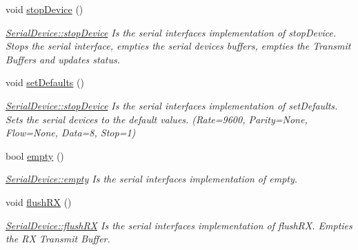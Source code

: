 \begin{DoxyCompactItemize}
\hypertarget{class_serial_device_a55f94898f33ab4674c138fa2cb2e75a1}{}\label{class_serial_device_a55f94898f33ab4674c138fa2cb2e75a1} 
void \hyperlink{class_serial_device_a55f94898f33ab4674c138fa2cb2e75a1}{stop\+Device} ()
\begin{DoxyCompactList}\small\item\em \hyperlink{class_serial_device_a55f94898f33ab4674c138fa2cb2e75a1}{Serial\+Device\+::stop\+Device} Is the serial interface\textquotesingle{}s implementation of stop\+Device. Stops the serial interface, empties the serial devices buffers, empties the Transmit Buffers and updates status. \end{DoxyCompactList}\item 
\hypertarget{class_serial_device_a08a8a19f8a25c1dc7593c91afc7d55bd}{}\label{class_serial_device_a08a8a19f8a25c1dc7593c91afc7d55bd} 
void \hyperlink{class_serial_device_a08a8a19f8a25c1dc7593c91afc7d55bd}{set\+Defaults} ()
\begin{DoxyCompactList}\small\item\em \hyperlink{class_serial_device_a55f94898f33ab4674c138fa2cb2e75a1}{Serial\+Device\+::stop\+Device} Is the serial interface\textquotesingle{}s implementation of set\+Defaults. Sets the serial devices to the default values. (Rate=9600, Parity=None, Flow=None, Data=8, Stop=1) \end{DoxyCompactList}\item 
bool \hyperlink{class_serial_device_ae9fc540188704dbdbf3e75d482a92b86}{empty} ()
\begin{DoxyCompactList}\small\item\em \hyperlink{class_serial_device_ae9fc540188704dbdbf3e75d482a92b86}{Serial\+Device\+::empty} Is the serial interface\textquotesingle{}s implementation of empty. \end{DoxyCompactList}\item 
\hypertarget{class_serial_device_a9ba3e46cf67a9b03e1614afe4c40d78a}{}\label{class_serial_device_a9ba3e46cf67a9b03e1614afe4c40d78a} 
void \hyperlink{class_serial_device_a9ba3e46cf67a9b03e1614afe4c40d78a}{flush\+RX} ()
\begin{DoxyCompactList}\small\item\em \hyperlink{class_serial_device_a9ba3e46cf67a9b03e1614afe4c40d78a}{Serial\+Device\+::flush\+RX} Is the serial interface\textquotesingle{}s implementation of flush\+RX. Empties the RX Transmit Buffer. \end{DoxyCompactList}\item 
\hypertarget{class_serial_device_a56d7c575161fd216821d06e25f37106c}{}\label{class_serial_device_a56d7c575161fd216821d06e25f37106c} 

\end{DoxyCompactItemize}
